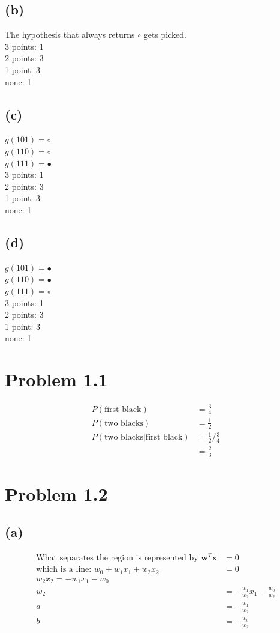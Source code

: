 \documentclass{article}
\begin{document}
	\subsection*{(b)}
		The hypothesis that always returns $\circ$ gets picked.\\
		3 points: 1\\
		2 points: 3\\
		1 point: 3\\
		none: 1
		
	\subsection*{(c)}
		$g(101) = \circ$\\
		$g(110) = \circ$\\
		$g(111) = \bullet$\\
		3 points: 1\\
		2 points: 3\\
		1 point: 3\\
		none: 1
		
	\subsection*{(d)}
		$g(101) = \bullet$\\
		$g(110) = \bullet$\\
		$g(111) = \circ$\\
		3 points: 1\\
		2 points: 3\\
		1 point: 3\\
		none: 1
		
	\section*{Problem 1.1}
		\begin{align*}
			P(\text{first black}) &= \frac34\\
			P(\text{two blacks}) &= \frac12\\
			P(\text{two blacks} | \text{first black}) &= \frac12 / \frac34\\
			&= \boxed{\frac23}
		\end{align*}
		
	\section*{Problem 1.2}
	\subsection*{(a)}
		\begin{align*}
			\text{What separates the region is represented by }\mathbf w^T\mathbf x &= 0\\
			\text{which is a line: } w_0 + w_1x_1 + w_2x_2 &= 0\\
			w_2x_2 = -w_1x_1 - w_0\\
			w_2 &= -\frac{w_1}{w_2}x_1 - \frac{w_0}{w_2}\\
			a &= -\frac{w_1}{w_2}\\
			b &= - \frac{w_0}{w_2}
		\end{align*}
\end{document}
